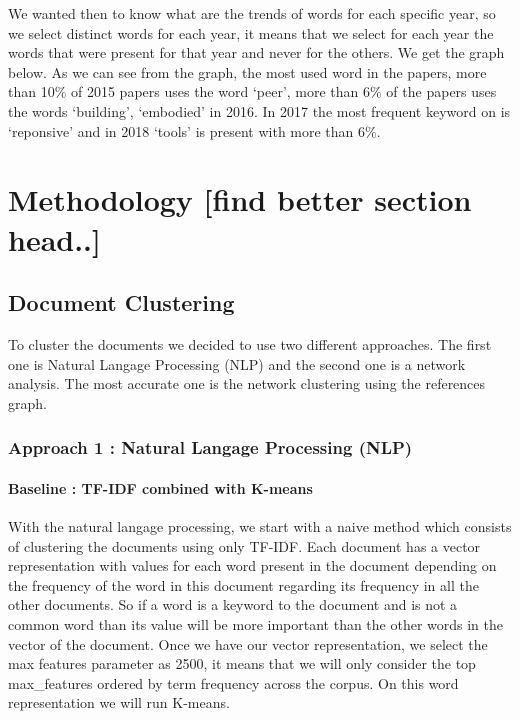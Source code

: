 \documentclass[journal,twocolumn]{IEEEtran}
\begin{document}
    We wanted then to know what are the trends of words for each specific
year, so we select distinct words for each year, it means that we select
for each year the words that were present for that year and never for
the others. We get the graph below. As we can see from the graph, the
most used word in the papers, more than 10\% of 2015 papers uses the
word `peer', more than 6\% of the papers uses the words `building',
`embodied' in 2016. In 2017 the most frequent keyword on is `reponsive'
and in 2018 `tools' is present with more than 6\%.

    \hypertarget{methodology-find-better-section-head..}{%
\section{Methodology {[}find better section
head..{]}}\label{methodology-find-better-section-head..}}

    \hypertarget{document-clustering}{%
\subsection{Document Clustering}\label{document-clustering}}

To cluster the documents we decided to use two different approaches. The
first one is Natural Langage Processing (NLP) and the second one is a
network analysis. The most accurate one is the network clustering using
the references graph.

\hypertarget{approach-1-natural-langage-processing-nlp}{%
\subsubsection{Approach 1 : Natural Langage Processing
(NLP)}\label{approach-1-natural-langage-processing-nlp}}

\hypertarget{baseline-tf-idf-combined-with-k-means}{%
\paragraph{Baseline : TF-IDF combined with
K-means}\label{baseline-tf-idf-combined-with-k-means}}

With the natural langage processing, we start with a naive method which
consists of clustering the documents using only TF-IDF. Each document
has a vector representation with values for each word present in the
document depending on the frequency of the word in this document
regarding its frequency in all the other documents. So if a word is a
keyword to the document and is not a common word than its value will be
more important than the other words in the vector of the document. Once
we have our vector representation, we select the max features parameter
as 2500, it means that we will only consider the top max\_features
ordered by term frequency across the corpus. On this word representation
we will run K-means.
\end{document}

